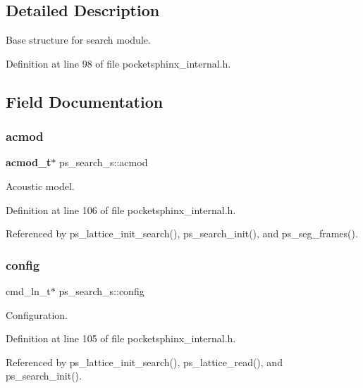 \subsection{Detailed Description}
Base structure for search module. 

Definition at line 98 of file pocketsphinx\+\_\+internal.\+h.



\subsection{Field Documentation}
\mbox{\label{structps__search__s_a0fdf6fe8c4d9c28f10c48c09517c6b91}} 
\subsubsection{acmod}
{\footnotesize\ttfamily \textbf{ acmod\+\_\+t}$\ast$ ps\+\_\+search\+\_\+s\+::acmod}



Acoustic model. 



Definition at line 106 of file pocketsphinx\+\_\+internal.\+h.



Referenced by ps\+\_\+lattice\+\_\+init\+\_\+search(), ps\+\_\+search\+\_\+init(), and ps\+\_\+seg\+\_\+frames().

\mbox{\label{structps__search__s_aa6e3e18165bbc70084a06575d5703042}} 
\subsubsection{config}
{\footnotesize\ttfamily cmd\+\_\+ln\+\_\+t$\ast$ ps\+\_\+search\+\_\+s\+::config}



Configuration. 



Definition at line 105 of file pocketsphinx\+\_\+internal.\+h.



Referenced by ps\+\_\+lattice\+\_\+init\+\_\+search(), ps\+\_\+lattice\+\_\+read(), and ps\+\_\+search\+\_\+init().

\mbox{\label{structps__search__s_a81b461e7ef3a080d046039e186134a15}} 

